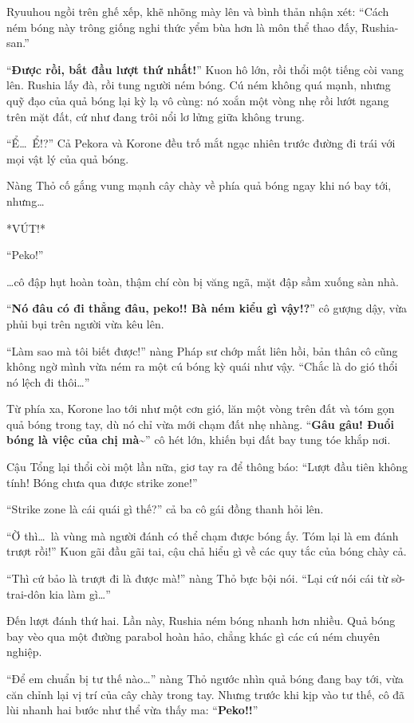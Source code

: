 \documentclass[../main.tex]{subfiles}
\begin{document}
Ryuuhou ngồi trên ghế xếp, khẽ nhõng mày lên và bình thản nhận xét: ``Cách ném bóng này trông giống nghi thức yểm bùa hơn là môn thể thao đấy, Rushia-san.''

``\textbf{Được rồi, bắt đầu lượt thứ nhất!}'' Kuon hô lớn, rồi thổi một tiếng còi vang lên. Rushia lấy đà, rồi tung người ném bóng. Cú ném không quá mạnh, nhưng quỹ đạo của quả bóng lại kỳ lạ vô cùng: nó xoắn một vòng nhẹ rồi lướt ngang trên mặt đất, cứ như đang trôi nổi lơ lửng giữa không trung.

``Ể\dots\ Ể!?'' Cả Pekora và Korone đều trố mắt ngạc nhiên trước đường đi trái với mọi vật lý của quả bóng.

Nàng Thỏ cố gắng vung mạnh cây chày về phía quả bóng ngay khi nó bay tới, nhưng\dots

*VÚT!*

``Peko!''

\dots cô đập hụt hoàn toàn, thậm chí còn bị văng ngã, mặt đập sầm xuống sàn nhà.

``\textbf{Nó đâu có đi thẳng đâu, peko!! Bà ném kiểu gì vậy!?}'' cô gượng dậy, vừa phủi bụi trên người vừa kêu lên.

``Làm sao mà tôi biết được!'' nàng Pháp sư chớp mắt liên hồi, bản thân cô cũng không ngờ mình vừa ném ra một cú bóng kỳ quái như vậy. ``Chắc là do gió thổi nó lệch đi thôi\dots''

Từ phía xa, Korone lao tới như một cơn gió, lăn một vòng trên đất và tóm gọn quả bóng trong tay, dù nó chỉ vừa mới chạm đất nhẹ nhàng. ``\textbf{Gâu gâu! Đuổi bóng là việc của chị mà\~{}}'' cô hét lớn, khiến bụi đất bay tung tóe khắp nơi.

Cậu Tổng lại thổi còi một lần nữa, giơ tay ra để thông báo: ``Lượt đầu tiên không tính! Bóng chưa qua được strike zone!''

``Strike zone là cái quái gì thế?'' cả ba cô gái đồng thanh hỏi lên.

``Ờ thì\dots\ là vùng mà người đánh có thể chạm được bóng ấy. Tóm lại là em đánh trượt rồi!'' Kuon gãi đầu gãi tai, cậu chả hiểu gì về các quy tắc của bóng chày cả.

``Thì cứ bảo là trượt đi là được mà!'' nàng Thỏ bực bội nói. ``Lại cứ nói cái từ sờ-trai-dôn kia làm gì\dots''

\ct

Đến lượt đánh thứ hai. Lần này, Rushia ném bóng nhanh hơn nhiều. Quả bóng bay vèo qua một đường parabol hoàn hảo, chẳng khác gì các cú ném chuyên nghiệp.

``Để em chuẩn bị tư thế nào\dots'' nàng Thỏ ngước nhìn quả bóng đang bay tới, vừa căn chỉnh lại vị trí của cây chày trong tay. Nhưng trước khi kịp vào tư thế, cô đã lùi nhanh hai bước như thể vừa thấy ma: ``\textbf{Peko!!}''
\end{document}
